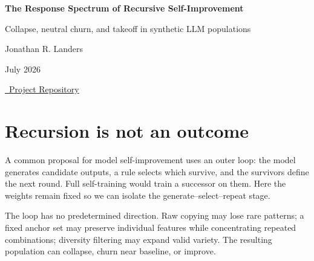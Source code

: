 \documentclass[10pt]{article}
\begin{document}
\begin{center}
{\LARGE \bfseries The Response Spectrum of Recursive Self-Improvement\par}
\vspace{0.15em}
{\large Collapse, neutral churn, and takeoff in synthetic LLM populations\par}
\vspace{0.75em}
{\large Jonathan R. Landers\par}
\vspace{0.25em}
{July 2026\par}
\vspace{0.15em}
{\small\href{https://github.com/jonland82/finite-response-kernels}{\faGithub\ Project Repository}\par}
\end{center}

\vspace{0.35em}

\begin{abstract}
A language model repeatedly exposed to its own outputs need not simply improve or collapse. We model recursive prompting as a stochastic transition on finite populations, with conditional drift locating collapse, stasis, neutral churn, and improvement on one spectrum. A fixed-weight experiment compares raw replacement, anchoring, diversity verification, and diversity-guided prompting, producing near-neutral drift, delayed collapse, and two forms of rapid improvement. Terminal gain records the outcome, a signed takeoff kernel records its delivery, and total response reveals reversals. A scalar control $\rho$ traces the response spectrum; differentiation with respect to $\rho$ gives its local dynamical direction. This is not recursive training: recursion supplies a channel, while selection determines its direction.
\end{abstract}

\section{Recursion is not an outcome}

A common proposal for model self-improvement uses an outer loop: the model generates candidate outputs, a rule selects which survive, and the survivors define the next round. Full self-training would train a successor on them. Here the weights remain fixed so we can isolate the generate--select--repeat stage.

The loop has no predetermined direction. Raw copying may lose rare patterns; a fixed anchor set may preserve individual features while concentrating repeated combinations; diversity filtering may expand valid variety. The resulting population can collapse, churn near baseline, or improve.
\end{document}

